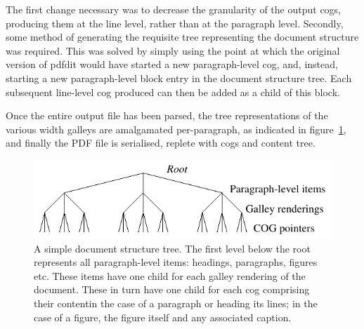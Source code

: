The first change necessary was to decrease the granularity of the output \gls{cog}s, producing them at the line level, rather than at the paragraph level. Secondly, some method of generating the requisite tree representing the document structure was required. This was solved by simply using the point at which the original version of pdfdit would have started a new paragraph-level \gls{cog}, and, instead, starting a new paragraph-level block entry in the document structure tree. Each subsequent line-level \gls{cog} produced can then be added as a child of this block.

Once the entire output file has been parsed, the tree representations of the various width galleys are amalgamated per-paragraph, as indicated in figure~\ref{fig:tree}, and finally the PDF file is serialised, replete with \gls{cog}s and content tree.

\begin{figure}
 \includegraphics[width=\textwidth]{gfx/tree}
 \caption[A simple document structure tree]{A simple document structure tree. The first level below the root represents all paragraph-level items: headings, paragraphs, figures etc. These items have one child for each galley rendering of the document. These in turn have one child for each \gls{cog} comprising their content\ed{}in the case of a paragraph or heading its lines; in the case of a figure, the figure itself and any associated caption.}
 \label{fig:tree}
\end{figure}


